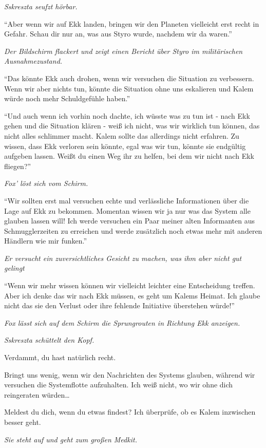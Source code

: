 \documentclass[11pt]{article}
\begin{document}
\emph{Sskreszta seufzt hörbar.}

``Aber wenn wir auf Ekk landen, bringen wir den Planeten vielleicht erst
recht in Gefahr. Schau dir nur an, was aus Styro wurde, nachdem wir da
waren.''

\emph{Der Bildschirm flackert und zeigt einen Bericht über Styro im
militärischen Ausnahmezustand.}

``Das könnte Ekk auch drohen, wenn wir versuchen die Situation zu
verbessern. Wenn wir aber nichts tun, könnte die Situation ohne uns
eskalieren und Kalem würde noch mehr Schuldgefühle haben.''

``Und auch wenn ich vorhin noch dachte, ich wüsste was zu tun ist - nach
Ekk gehen und die Situation klären - weiß ich nicht, was wir wirklich
tun können, das nicht alles schlimmer macht. Kalem sollte das allerdings
nicht erfahren. Zu wissen, dass Ekk verloren sein könnte, egal was wir
tun, könnte sie endgültig aufgeben lassen. Weißt du einen Weg ihr zu
helfen, bei dem wir nicht nach Ekk fliegen?''

\emph{Fox' löst sich vom Schirm.}

``Wir sollten erst mal versuchen echte und verlässliche Informationen
über die Lage auf Ekk zu bekommen. Momentan wissen wir ja nur was das
System alle glauben lassen will! Ich werde versuchen ein Paar meiner
alten Informanten aus Schmugglerzeiten zu erreichen und werde zusätzlich
noch etwas mehr mit anderen Händlern wie mir funken.''

\emph{Er versucht ein zuversichtliches Gesicht zu machen, was ihm aber
nicht gut gelingt}

``Wenn wir mehr wissen können wir vielleicht leichter eine Entscheidung
treffen. Aber ich denke das wir nach Ekk müssen, es geht um Kalems
Heimat. Ich glaube nicht das sie den Verlust oder ihre fehlende
Initiative überstehen würde!''

\emph{Fox lässt sich auf dem Schirm die Sprungrouten in Richtung Ekk
anzeigen.}

\emph{Sskreszta schüttelt den Kopf.}

Verdammt, du hast natürlich recht.

Bringt uns wenig, wenn wir den Nachrichten des Systems glauben, während
wir versuchen die Systemflotte aufzuhalten. Ich weiß nicht, wo wir ohne
dich reingeraten würden\ldots{}

Meldest du dich, wenn du etwas findest? Ich überprüfe, ob es Kalem
inzwischen besser geht.

\emph{Sie steht auf und geht zum großen Medkit.}
\end{document}
